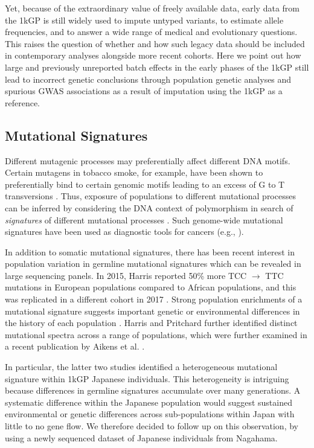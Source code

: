 \documentclass[9pt,lineno]{template}
\begin{document}
Yet, because of the extraordinary value of freely available data, early data from the 1kGP is still widely used to impute untyped variants, to estimate allele frequencies, and to answer a wide range of medical and evolutionary questions.
This raises the question of whether and how such legacy data should be included in contemporary analyses alongside more recent cohorts.
Here we point out how large and previously unreported batch effects in the early phases of the 1kGP still lead to incorrect genetic conclusions through population genetic analyses and spurious GWAS associations as a result of imputation using the 1kGP as a reference.

\subsection{Mutational Signatures}

Different mutagenic processes may preferentially affect different DNA motifs. 
Certain mutagens in tobacco smoke, for example, have been shown to preferentially bind to certain genomic motifs leading to an excess of G to T transversions \citep{Pfeifer2002,Pleasance2010}. 
Thus, exposure of populations to different mutational processes can be inferred by considering the DNA context of polymorphism in search of \textit{signatures} of different mutational processes \citep{Alexandrov2013,Shiraishi2015a}. 
Such genome-wide mutational signatures have been used as diagnostic tools for cancers (e.g., \cite{Alexandrov2013,Shiraishi2015a}).

In addition to somatic mutational signatures, there has been recent interest in population variation in germline mutational signatures which can be revealed in large sequencing panels. 
In 2015, Harris reported 50\% more TCC ${\rightarrow}$ TTC mutations in European populations compared to African populations, and this was replicated in a different cohort in 2017 \citep{Harris2015a, Harris2017a, Mathieson2017a}. 
Strong population enrichments of a mutational signature suggests important genetic or environmental differences in the history of each population \citep{Harris2015a, Harris2017a}. 
Harris and Pritchard further identified distinct mutational spectra across a range of populations, which were further examined in a recent publication by Aikens et al. \citep{Harris2017a,Aikens2018}.
 
In particular, the latter two studies  identified a heterogeneous mutational signature within 1kGP Japanese individuals.
This heterogeneity is intriguing because differences in germline signatures accumulate over many generations.
A systematic difference within the Japanese population would suggest sustained environmental or genetic differences across sub-populations within Japan with little to no gene flow.
We therefore decided to follow up on this observation, by using a newly sequenced dataset of Japanese individuals from Nagahama. 
\end{document}
